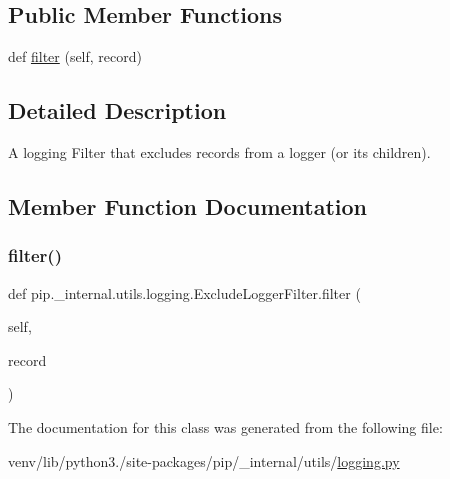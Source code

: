 \subsection*{Public Member Functions}
\begin{DoxyCompactItemize}
\item 
def \hyperlink{classpip_1_1__internal_1_1utils_1_1logging_1_1ExcludeLoggerFilter_a9ab77a48e615fd82fe43a88e13ec1241}{filter} (self, record)
\end{DoxyCompactItemize}


\subsection{Detailed Description}
\begin{DoxyVerb}A logging Filter that excludes records from a logger (or its children).
\end{DoxyVerb}
 

\subsection{Member Function Documentation}
\mbox{\label{classpip_1_1__internal_1_1utils_1_1logging_1_1ExcludeLoggerFilter_a9ab77a48e615fd82fe43a88e13ec1241}} 
\subsubsection{\texorpdfstring{filter()}{filter()}}
{\footnotesize\ttfamily def pip.\+\_\+internal.\+utils.\+logging.\+Exclude\+Logger\+Filter.\+filter (\begin{DoxyParamCaption}\item[{}]{self,  }\item[{}]{record }\end{DoxyParamCaption})}



The documentation for this class was generated from the following file\+:\begin{DoxyCompactItemize}
\item 
venv/lib/python3./site-\/packages/pip/\+\_\+internal/utils/\hyperlink{logging_8py}{logging.\+py}\end{DoxyCompactItemize}
